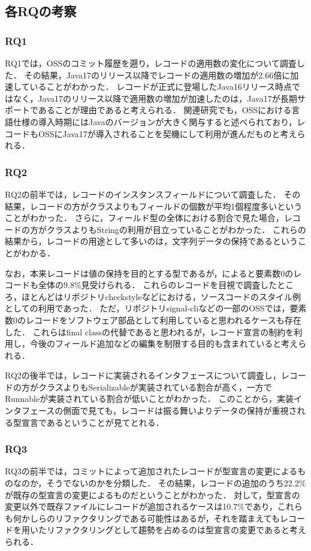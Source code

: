 \subsection{各RQの考察}
\subsubsection{RQ1}
RQ1では，OSSのコミット履歴を遡り，レコードの適用数の変化について調査した．
その結果，Java17のリリース以降でレコードの適用数の増加が2.66倍に加速していることがわかった．
レコードが正式に登場したJava16リリース時点ではなく，Java17のリリース以降で適用数の増加が加速したのは，Java17が長期サポートであることが理由であると考えられる．
関連研究\cite{Generics_Research}でも，OSSにおける言語仕様の導入時期にはJavaのバージョンが大きく関与すると述べられており，レコードもOSSにJava17が導入されることを契機にして利用が進んだものと考えられる．

\subsubsection{RQ2}
RQ2の前半では，レコードのインスタンスフィールドについて調査した．
その結果，レコードの方がクラスよりもフィールドの個数が平均1個程度多いということがわかった．
さらに，フィールド型の全体における割合で見た場合，レコードの方がクラスよりもStringの利用が目立っていることがわかった．
これらの結果から，レコードの用途として多いのは，文字列データの保持であるということがわかる．

なお，本来レコードは値の保持を目的とする型であるが，によると要素数0のレコードも全体の9.8\%見受けられる．
これらのレコードを目視で調査したところ，ほとんどはリポジトリcheckstyleなどにおける，ソースコードのスタイル例としての利用であった．
ただ，リポジトリsignal-cliなどの一部のOSSでは，要素数0のレコードをソフトウェア部品として利用していると思われるケースも存在した．
これらはfinal classの代替であると思われるが，レコード宣言の制約を利用し，今後のフィールド追加などの編集を制限する目的も含まれていると考えられる．

RQ2の後半では，レコードに実装されるインタフェースについて調査し，レコードの方がクラスよりもSerializableが実装されている割合が高く，一方でRunnableが実装されている割合が低いことがわかった．
このことから，実装インタフェースの側面で見ても，レコードは振る舞いよりデータの保持が重視される型宣言であるということが見てとれる．

\subsubsection{RQ3}
RQ3の前半では，コミットによって追加されたレコードが型宣言の変更によるものなのか，そうでないのかを分類した．
その結果，レコードの追加のうち22.2\%が既存の型宣言の変更によるものだということがわかった．
対して，型宣言の変更以外で既存ファイルにレコードが追加されるケースは10.7\%であり，これらも何かしらのリファクタリングである可能性はあるが，それを踏まえてもレコードを用いたリファクタリングとして趨勢を占めるのは型宣言の変更であると考えられる．

